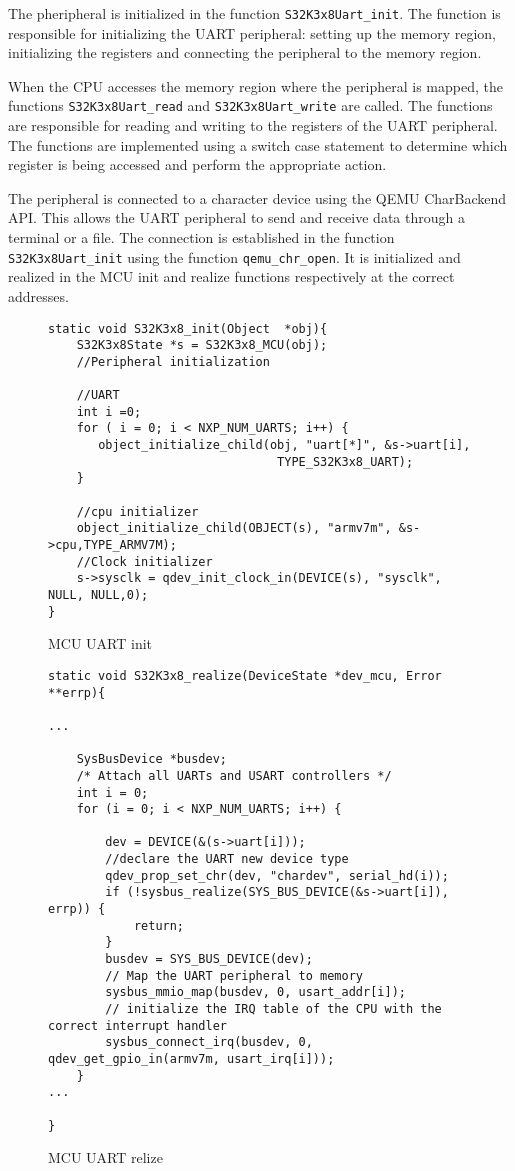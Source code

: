 The pheripheral is initialized in the function \texttt{S32K3x8Uart\_init}. The function is responsible for initializing the UART peripheral: setting up the memory region, initializing the registers and connecting the peripheral to the memory region. 

When the CPU accesses the memory region where the peripheral is mapped, the functions \texttt{S32K3x8Uart\_read} and \texttt{S32K3x8Uart\_write} are called. The functions are responsible for reading and writing to the registers of the UART peripheral. The functions are implemented using a switch case statement to determine which register is being accessed and perform the appropriate action.

The peripheral is connected to a character device using the QEMU CharBackend API. This allows the UART peripheral to send and receive data through a terminal or a file. The connection is established in the function \texttt{S32K3x8Uart\_init} using the function \texttt{qemu\_chr\_open}. It is initialized and realized in the MCU init and realize functions respectively at the correct addresses.

\begin{figure}
    \begin{verbatim}
static void S32K3x8_init(Object  *obj){
    S32K3x8State *s = S32K3x8_MCU(obj);
    //Peripheral initialization
    
    //UART
    int i =0;
    for ( i = 0; i < NXP_NUM_UARTS; i++) {
       object_initialize_child(obj, "uart[*]", &s->uart[i],
                                TYPE_S32K3x8_UART);
    }
    
    //cpu initializer
    object_initialize_child(OBJECT(s), "armv7m", &s->cpu,TYPE_ARMV7M);
    //Clock initializer
    s->sysclk = qdev_init_clock_in(DEVICE(s), "sysclk", NULL, NULL,0);
}
    \end{verbatim}
    \caption{MCU UART init}
    \label{fig:UART_init}
\end{figure}

\begin{figure}
    \begin{verbatim}
static void S32K3x8_realize(DeviceState *dev_mcu, Error **errp){

...

    SysBusDevice *busdev;
    /* Attach all UARTs and USART controllers */
    int i = 0;
    for (i = 0; i < NXP_NUM_UARTS; i++) {

        dev = DEVICE(&(s->uart[i]));
        //declare the UART new device type
        qdev_prop_set_chr(dev, "chardev", serial_hd(i));
        if (!sysbus_realize(SYS_BUS_DEVICE(&s->uart[i]), errp)) {
            return;
        }
        busdev = SYS_BUS_DEVICE(dev);
        // Map the UART peripheral to memory
        sysbus_mmio_map(busdev, 0, usart_addr[i]);
        // initialize the IRQ table of the CPU with the correct interrupt handler
        sysbus_connect_irq(busdev, 0, qdev_get_gpio_in(armv7m, usart_irq[i]));
    }
...

}
    \end{verbatim}
    \caption{MCU UART relize}
    \label{fig:UART_relize}
\end{figure}

